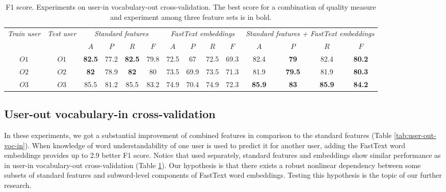 \begin{table}[h]
\begin{tabular}{cc|cccc|cccc|cccc}
\multirow{2}{0.6cm}{\textit{Train user}} & \multirow{2}{0.6cm}{\textit{Test user}} & \multicolumn{4}{c|}{\textit{Standard features}} & \multicolumn{4}{c|}{\textit{FastText embeddings}} & \multicolumn{4}{X}{\textit{Standard features + FastText embeddings}} \\ \cline{3-14} 
 &  & $A$ & $P$ & $R$ & $F$ & $A$ & $P$ & $R$ & $F$ & $A$ & $P$ & $R$ & $F$ \\ \hline
$O1$ & $O1$ & \textbf{82.5} & 77.2 & \textbf{82.5} & 79.8 & 72.5 & 67 & 72.5 & 69.3 & 82.4 & \textbf{79} & 82.4 & \textbf{80.2} \\
$O2$ & $O2$ & \textbf{82} & 78.9 & \textbf{82} & 80 & 73.5 & 69.9 & 73.5 & 71.3 & 81.9 & \textbf{79.5} & 81.9 & \textbf{80.3} \\ 
$O3$ & $O3$ & 85.5 & 81.2 & 85.5 & 83.2 & 74.9 & 70.4 & 74.9 & 72.3 & \textbf{85.9} & \textbf{83} & \textbf{85.9} & \textbf{84.2} \\ \hline 
\end{tabular}
    \caption{F1 score. Experiments on user-in vocabulary-out cross-validation. The best score for a combination of quality measure and experiment among three feature sets is in bold.}
    \label{tab:user-in-voc-out}
\end{table}


\subsection{User-out vocabulary-in cross-validation}

In these experiments, we got a substantial improvement of combined features in comparison to the standard features (Table \ref{tab:user-out-voc-in}). When knowledge of word understandability of one user is used to predict it for another user, adding the FastText word embeddings provides up to 2.9 better F1 score. Notice that used separately, standard features and embeddings show similar performance as in user-in vocabulary-out cross-validation (Table \ref{tab:user-in-voc-out}). Our hypothesis is that there exists a robust nonlinear dependency between some subsets of standard features and subword-level components of FastText word embeddings. Testing this hypothesis is the topic of our further research.

